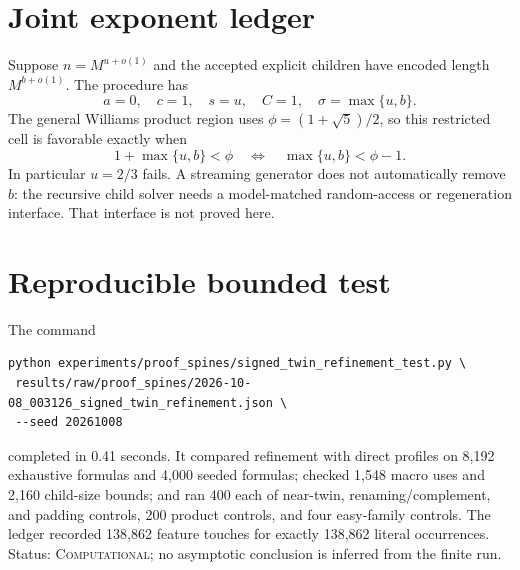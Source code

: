 \documentclass[11pt]{article}
\begin{document}
\section{Joint exponent ledger}
Suppose $n=M^{u+o(1)}$ and the accepted explicit children have encoded length
$M^{b+o(1)}$.  The procedure has
\[
a=0,\quad c=1,\quad s=u,\quad C=1,\quad
\sigma=\max\{u,b\}.
\]
The general Williams product region uses
$\phi=(1+\sqrt5)/2$, so this restricted cell is favorable exactly when
\[
1+\max\{u,b\}<\phi
\quad\Longleftrightarrow\quad
\max\{u,b\}<\phi-1.
\]
In particular $u=2/3$ fails.  A streaming generator does not automatically
remove $b$: the recursive child solver needs a model-matched random-access or
regeneration interface.  That interface is not proved here.

\section{Reproducible bounded test}
The command
\begin{verbatim}
python experiments/proof_spines/signed_twin_refinement_test.py \
 results/raw/proof_spines/2026-10-08_003126_signed_twin_refinement.json \
 --seed 20261008
\end{verbatim}
completed in 0.41 seconds.  It compared refinement with direct profiles on
8,192 exhaustive formulas and 4,000 seeded formulas; checked 1,548 macro
uses and 2,160 child-size bounds; and ran 400 each of near-twin,
renaming/complement, and padding controls, 200 product controls, and four
easy-family controls.  The ledger recorded 138,862 feature touches for
exactly 138,862 literal occurrences.  Status: \textsc{Computational}; no
asymptotic conclusion is inferred from the finite run.
\end{document}
